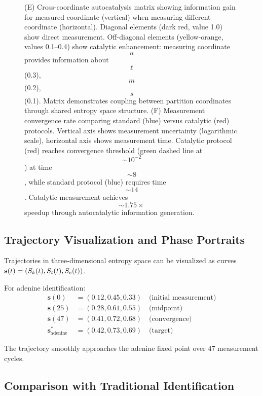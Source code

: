 \begin{figure}[htbp]
{        (E) Cross-coordinate autocatalysis matrix showing information gain for measured coordinate (vertical) when measuring different coordinate (horizontal). Diagonal elements (dark red, value 1.0) show direct measurement. Off-diagonal elements (yellow-orange, values 0.1--0.4) show catalytic enhancement: measuring coordinate $$n$$ provides information about $$\ell$$ (0.3), $$m$$ (0.2), $$s$$ (0.1). Matrix demonstrates coupling between partition coordinates through shared entropy space structure. 
        (F) Measurement convergence rate comparing standard (blue) versus catalytic (red) protocols. Vertical axis shows measurement uncertainty (logarithmic scale), horizontal axis shows measurement time. Catalytic protocol (red) reaches convergence threshold (green dashed line at $$\sim 10^{-2}$$) at time $$\sim 8$$, while standard protocol (blue) requires time $$\sim 14$$. Catalytic measurement achieves $$\sim 1.75\times$$ speedup through autocatalytic information generation.}
        \label{fig:experimental_validation}
        \end{figure}

\subsection{Trajectory Visualization and Phase Portraits}

Trajectories in three-dimensional entropy space can be visualized as curves $\mathbf{s}(t) = (S_k(t), S_t(t), S_e(t))$.

For adenine identification:
\begin{align}
\mathbf{s}(0) &= (0.12, 0.45, 0.33) \quad \text{(initial measurement)} \\
\mathbf{s}(25) &= (0.28, 0.61, 0.55) \quad \text{(midpoint)} \\
\mathbf{s}(47) &= (0.41, 0.72, 0.68) \quad \text{(convergence)} \\
\mathbf{s}^*_{\text{adenine}} &= (0.42, 0.73, 0.69) \quad \text{(target)}
\end{align}

The trajectory smoothly approaches the adenine fixed point over 47 measurement cycles.

\subsection{Comparison with Traditional Identification}

